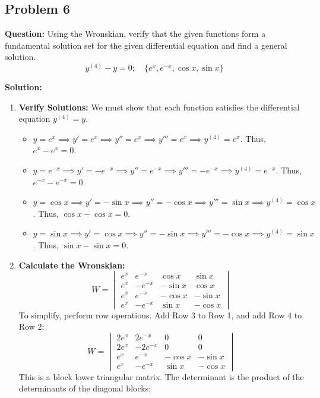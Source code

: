 \documentclass[11pt, a4paper]{article}
\theoremstyle{definition}
\theoremstyle{remark}
\begin{document}
\vspace{1em}
\subsection{Problem 6}
\textbf{Question:} Using the Wronskian, verify that the given functions form a fundamental solution set for the given differential equation and find a general solution.
\[ y^{(4)} - y = 0; \quad \{e^x, e^{-x}, \cos x, \sin x\} \]

\textbf{Solution:}
\begin{enumerate}
    \item \textbf{Verify Solutions:} We must show that each function satisfies the differential equation $y^{(4)} = y$.
    \begin{itemize}
        \item $y = e^x \implies y' = e^x \implies y'' = e^x \implies y''' = e^x \implies y^{(4)} = e^x$. Thus, $e^x - e^x = 0$.
        \item $y = e^{-x} \implies y' = -e^{-x} \implies y'' = e^{-x} \implies y''' = -e^{-x} \implies y^{(4)} = e^{-x}$. Thus, $e^{-x} - e^{-x} = 0$.
        \item $y = \cos x \implies y' = -\sin x \implies y'' = -\cos x \implies y''' = \sin x \implies y^{(4)} = \cos x$. Thus, $\cos x - \cos x = 0$.
        \item $y = \sin x \implies y' = \cos x \implies y'' = -\sin x \implies y''' = -\cos x \implies y^{(4)} = \sin x$. Thus, $\sin x - \sin x = 0$.
    \end{itemize}
    \item \textbf{Calculate the Wronskian:}
    \[ W = \begin{vmatrix} e^x & e^{-x} & \cos x & \sin x \\ e^x & -e^{-x} & -\sin x & \cos x \\ e^x & e^{-x} & -\cos x & -\sin x \\ e^x & -e^{-x} & \sin x & -\cos x \end{vmatrix} \]
    To simplify, perform row operations. Add Row 3 to Row 1, and add Row 4 to Row 2:
    \[ W = \begin{vmatrix} 2e^x & 2e^{-x} & 0 & 0 \\ 2e^x & -2e^{-x} & 0 & 0 \\ e^x & e^{-x} & -\cos x & -\sin x \\ e^x & -e^{-x} & \sin x & -\cos x \end{vmatrix} \]
    This is a block lower triangular matrix. The determinant is the product of the determinants of the diagonal blocks:

\end{enumerate}
\end{document}
